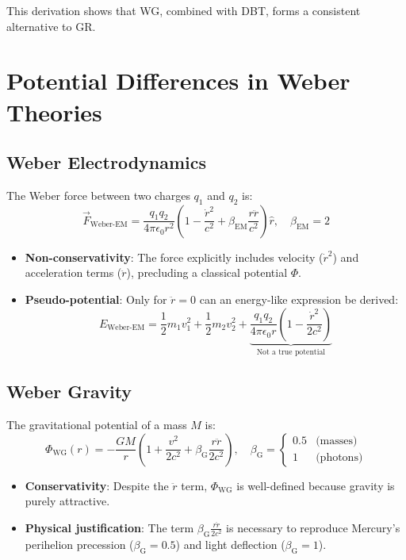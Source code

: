 This derivation shows that WG, combined with DBT, forms a consistent alternative to GR.

\section{Potential Differences in Weber Theories}
\label{sec:weber_potentials}

\subsection{Weber Electrodynamics}
The Weber force between two charges $q_1$ and $q_2$ is:
\[
\vec{F}_{\text{Weber-EM}} = \frac{q_1 q_2}{4\pi\epsilon_0 r^2} \left(1 - \frac{\dot{r}^2}{c^2} + \beta_{\text{EM}} \frac{r\ddot{r}}{c^2}\right)\hat{r}, \quad \beta_{\text{EM}} = 2
\]
\begin{itemize}
\item \textbf{Non-conservativity}: The force explicitly includes velocity ($\dot{r}^2$) and acceleration terms ($\ddot{r}$), precluding a classical potential $\Phi$.
\item \textbf{Pseudo-potential}: Only for $\ddot{r} = 0$ can an energy-like expression be derived:
\[
E_{\text{Weber-EM}} = \frac{1}{2}m_1v_1^2 + \frac{1}{2}m_2v_2^2 + \underbrace{\frac{q_1 q_2}{4\pi\epsilon_0 r}\left(1 - \frac{\dot{r}^2}{2c^2}\right)}_{\text{Not a true potential}}
\]
\end{itemize}

\subsection{Weber Gravity}
The gravitational potential of a mass $M$ is:
\[
\Phi_{\text{WG}}(r) = -\frac{GM}{r}\left(1 + \frac{v^2}{2c^2} + \beta_{\text{G}} \frac{r\ddot{r}}{2c^2}\right), \quad \beta_{\text{G}} = 
\begin{cases}
0.5 & \text{(masses)} \\
1 & \text{(photons)}
\end{cases}
\]
\begin{itemize}
\item \textbf{Conservativity}: Despite the $\ddot{r}$ term, $\Phi_{\text{WG}}$ is well-defined because gravity is purely attractive.
\item \textbf{Physical justification}: The term $\beta_{\text{G}}\frac{r\ddot{r}}{2c^2}$ is necessary to reproduce Mercury's perihelion precession ($\beta_{\text{G}} = 0.5$) and light deflection ($\beta_{\text{G}} = 1$).
\end{itemize}

